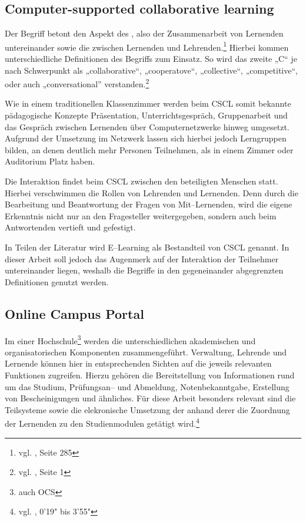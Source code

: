 \subsection{Computer-supported collaborative learning} %
\label{sub:cscl}
Der Begriff  betont den Aspekt des , also der Zusammenarbeit von Lernenden untereinander sowie die zwischen Lernenden und Lehrenden.\footnote{vgl. \cite{euler:boos}, Seite 285} Hierbei kommen unterschiedliche Definitionen des Begriffs zum Einsatz. So wird das zweite „C“ je nach Schwerpunkt als „collaborative“, „cooperatove“, „collective“, „competitive“, oder auch „conversational” verstanden.\footnote{vgl. \cite{csclcomp}, Seite 1} 

Wie in einem traditionellen Klassenzimmer werden beim \ac{CSCL} somit bekannte pädagogische Konzepte Präsentation, Unterrichtsgespräch, Gruppenarbeit und das Gespräch zwischen Lernenden über Computernetzwerke hinweg umgesetzt. Aufgrund der Umsetzung im Netzwerk lassen sich hierbei jedoch Lerngruppen bilden, an denen deutlich mehr Personen Teilnehmen, als in einem Zimmer oder Auditorium Platz haben.

Die Interaktion findet beim \ac{CSCL} zwischen den beteiligten Menschen statt. Hierbei verschwimmen die Rollen von Lehrenden und Lernenden. Denn durch die Bearbeitung und Beantwortung der Fragen von Mit–Lernenden, wird die eigene Erkenntnis nicht nur an den Fragesteller weitergegeben, sondern auch beim Antwortenden vertieft und gefestigt. 


In Teilen der Literatur wird E–Learning als Bestandteil von \ac{CSCL} genannt. In dieser Arbeit soll jedoch das Augenmerk auf der Interaktion der Teilnehmer untereinander liegen, weshalb die Begriffe in den gegeneinander abgegrenzten Definitionen genutzt werden.

\subsection{Online Campus Portal} %
\label{sub:online_campus_portal}
Im  einer Hochschule\footnote{auch \ac{OCS}} werden die unterschiedlichen akademischen und organisatorischen Komponenten zusammengeführt. Verwaltung, Lehrende und Lernende können hier in entsprechenden Sichten auf die jeweils relevanten Funktionen zugreifen. Hierzu gehören die Bereitstellung von Informationen rund um das Studium, Prüfungsan– und Abmeldung, Notenbekanntgabe, Erstellung von Bescheinigungen und ähnliches. Für diese Arbeit besonders relevant sind die Teilsysteme  sowie die elekronische Umsetzung der  anhand derer die Zuordnung der Lernenden zu den Studienmodulen getätigt wird.\footnote{vgl. \cite{akad:campus}, 0'19" bis 3'55"}

